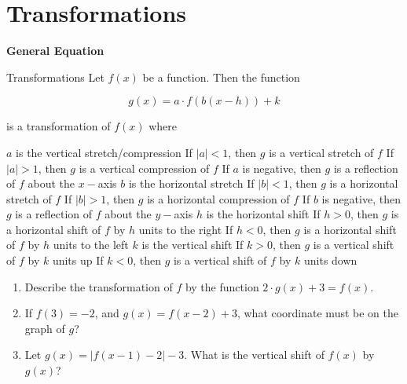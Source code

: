 \section{Transformations} 

\textbf{General Equation}

\bigskip
\begin{equationbox}{Transformations}
Let $f(x)$ be a function. Then the function

\[g(x)=a\cdot f(b(x-h))+k\]

is a transformation of $f(x)$ where

\begin{outline}
\1 $a$ is the vertical stretch/compression
\2 If $|a|<1$, then $g$ is a vertical stretch of $f$
\2 If $|a|>1$, then $g$ is a vertical compression of $f$
\2 If $a$ is negative, then $g$ is a reflection of $f$ about the $x-$axis
\1 $b$ is the horizontal stretch
\2 If $|b|<1$, then $g$ is a horizontal stretch of $f$
\2 If $|b|>1$, then $g$ is a horizontal compression of $f$
\2 If $b$ is negative, then $g$ is a reflection of $f$ about the $y-$axis
\1 $h$ is the horizontal shift
\2 If $h>0$, then $g$ is a horizontal shift of $f$ by $h$ units to the right
\2 If $h<0$, then $g$ is a horizontal shift of $f$ by $h$ units to the left
\1 $k$ is the vertical shift
\2 If $k>0$, then $g$ is a vertical shift of $f$ by $k$ units up
\2 If $k<0$, then $g$ is a vertical shift of $f$ by $k$ units down
\end{outline}
\end{equationbox}

\bigskip
\begin{enumerate}[labelindent=*,style=multiline,leftmargin=*,label=\textbf{Example \arabic*:}]
\item Describe the transformation of $f$ by the function $2\cdot g(x)+3=f(x)$.
\vfill\item If $f(3)=-2$, and $g(x)=f(x-2)+3$, what coordinate must be on the graph of $g$?
\vfill\item Let $g(x)=|f(x-1)-2|-3$. What is the vertical shift of $f(x)$ by $g(x)$?
\end{enumerate}


